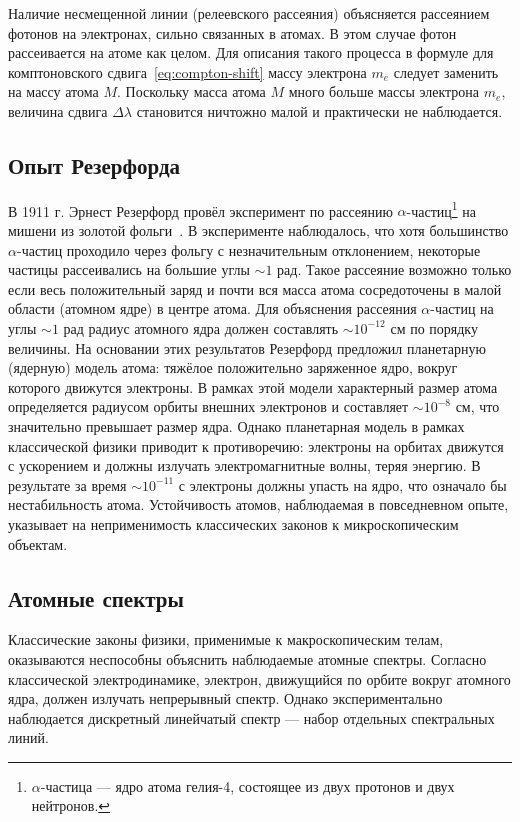 \documentclass[a4paper, 12pt]{article}
\begin{document}
Наличие несмещенной линии (релеевского рассеяния) объясняется рассеянием фотонов на электронах, сильно связанных в атомах. В этом случае фотон рассеивается на атоме как целом. Для описания такого процесса в формуле для комптоновского сдвига~\eqref{eq:compton-shift}
массу электрона $m_e$ следует заменить на массу атома $M$. Поскольку масса атома
$M$ много больше массы электрона $m_e$, величина сдвига $\Delta\lambda$ становится ничтожно
малой и практически не наблюдается.

\subsection{Опыт Резерфорда}
В 1911 г. Эрнест Резерфорд провёл эксперимент по рассеянию
$\alpha$-частиц\footnote{$\alpha$-частица --- ядро атома гелия-4, состоящее из двух протонов и
  двух нейтронов.} на мишени из золотой фольги~\cite{Rutherford1911}. В эксперименте наблюдалось, что
хотя большинство $\alpha$-частиц проходило через фольгу с незначительным отклонением,
некоторые частицы рассеивались на большие углы $\sim 1 \text{ рад}$.
Такое рассеяние возможно только если весь положительный заряд и почти вся масса
атома сосредоточены в малой области (атомном ядре) в центре атома. Для
объяснения рассеяния $\alpha$-частиц на углы $\sim 1\text{ рад}$ радиус атомного ядра
должен составлять $\sim 10^{-12}\text{ см}$ по порядку величины.
На основании этих результатов Резерфорд предложил планетарную (ядерную) модель
атома: тяжёлое положительно
заряженное ядро, вокруг которого движутся электроны. В рамках этой модели
характерный размер атома определяется радиусом орбиты внешних электронов
и составляет $\sim 10^{-8}\text{ см}$, что значительно превышает размер ядра.
Однако планетарная модель в рамках классической физики приводит к противоречию:
электроны на орбитах движутся с ускорением и должны излучать электромагнитные
волны, теряя энергию. В результате за время $\sim 10^{-11}\text{ с}$ электроны
должны упасть на ядро, что означало бы нестабильность атома. Устойчивость
атомов, наблюдаемая в повседневном опыте, указывает на неприменимость
классических законов к микроскопическим объектам.

\subsection{Атомные спектры}
Классические законы физики, применимые к макроскопическим телам, оказываются
неспособны объяснить наблюдаемые атомные спектры. Согласно классической
электродинамике, электрон, движущийся по орбите вокруг атомного ядра, должен
излучать непрерывный спектр. Однако экспериментально наблюдается дискретный
линейчатый спектр --- набор отдельных спектральных линий.
\end{document}
